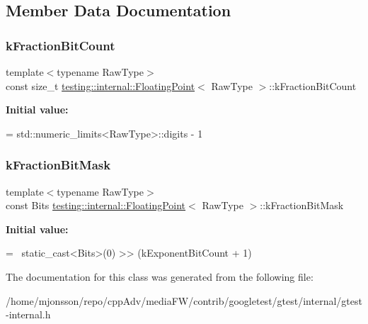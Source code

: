 \subsection{Member Data Documentation}
\mbox{\label{classtesting_1_1internal_1_1FloatingPoint_a0b756a6d2a4f5f5b41ca79651c06c043}} 
\subsubsection{\texorpdfstring{k\+Fraction\+Bit\+Count}{kFractionBitCount}}
{\footnotesize\ttfamily template$<$typename Raw\+Type$>$ \\
const size\+\_\+t \hyperlink{classtesting_1_1internal_1_1FloatingPoint}{testing\+::internal\+::\+Floating\+Point}$<$ Raw\+Type $>$\+::k\+Fraction\+Bit\+Count\hspace{0.3cm}{\ttfamily [static]}}

{\bfseries Initial value\+:}
\begin{DoxyCode}
=
    std::numeric\_limits<RawType>::digits - 1
\end{DoxyCode}
\mbox{\label{classtesting_1_1internal_1_1FloatingPoint_a0ac75d4ffd24f14bca452abe8a718da1}} 
\subsubsection{\texorpdfstring{k\+Fraction\+Bit\+Mask}{kFractionBitMask}}
{\footnotesize\ttfamily template$<$typename Raw\+Type$>$ \\
const Bits \hyperlink{classtesting_1_1internal_1_1FloatingPoint}{testing\+::internal\+::\+Floating\+Point}$<$ Raw\+Type $>$\+::k\+Fraction\+Bit\+Mask\hspace{0.3cm}{\ttfamily [static]}}

{\bfseries Initial value\+:}
\begin{DoxyCode}
=
    ~static\_cast<Bits>(0) >> (kExponentBitCount + 1)
\end{DoxyCode}


The documentation for this class was generated from the following file\+:\begin{DoxyCompactItemize}
\item 
/home/mjonsson/repo/cpp\+Adv/media\+F\+W/contrib/googletest/gtest/internal/gtest-\/internal.\+h\end{DoxyCompactItemize}
